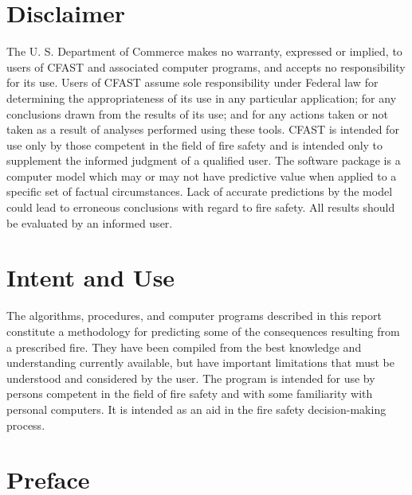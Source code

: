 \documentclass[12pt]{book}
\begin{document}
\chapter{Disclaimer}

The U. S. Department of Commerce makes no warranty, expressed or implied, to users of 
CFAST and associated computer programs, and accepts no responsibility for its use.  Users of 
CFAST assume sole responsibility under Federal law for determining the appropriateness of its 
use in any particular application; for any conclusions drawn from the results of its use; and for 
any actions taken or not taken as a result of analyses performed using these tools. 
CFAST is intended for use only by those competent in the field of fire safety and is intended 
only to supplement the informed judgment of a qualified user. The software package is a 
computer model which may or may not have predictive value when applied to a specific set of 
factual circumstances. Lack of accurate predictions by the model could lead to erroneous 
conclusions with regard to fire safety. All results should be evaluated by an informed user.

\chapter{Intent and Use}

The algorithms, procedures, and computer programs described in this report constitute a 
methodology for predicting some of the consequences resulting from a prescribed fire.  They 
have been compiled from the best knowledge and understanding currently available, but have 
important limitations that must be understood and considered by the user.  The program is 
intended for use by persons competent in the field of fire safety and with some familiarity with 
personal computers. It is intended as an aid in the fire safety decision-making process.

\chapter{Preface}
\end{document}
